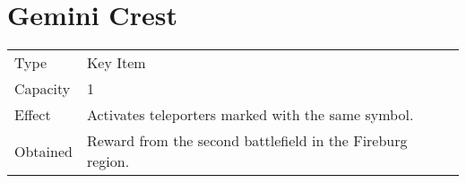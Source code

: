 \section{Gemini Crest}
\label{item:gemini_crest}


\noindent\begin{tabularx}{\textwidth}[l]{lX}
	Type
	& Key Item
\\ %
	Capacity
	& 1
\\ %
	Effect
	& Activates teleporters marked with the same symbol.
\\ %
	Obtained
	& Reward from the second battlefield in the Fireburg region.
\end{tabularx}
